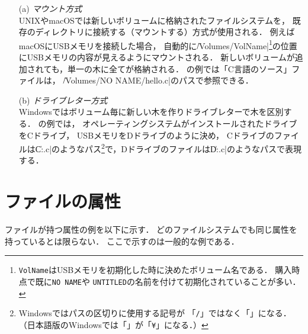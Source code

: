 \begin{itemize}
\item[(a)] \emph{マウント方式} \\
  UNIXやmacOSでは新しいボリュームに格納されたファイルシステムを，
  既存のディレクトリに接続する（マウントする）方式が使用される．
  例えばmacOSにUSBメモリを接続した場合，
  自動的に\|/Volumes/VolName|\footnote{
    \texttt{VolName}はUSBメモリを初期化した時に決めたボリューム名である．
    購入時点で既に\texttt{NO NAME}や
    \texttt{UNTITLED}の名前を付けて初期化されていることが多い．
  }の位置にUSBメモリの内容が見えるようにマウントされる．
  新しいボリュームが追加されても，単一の木に全てが格納される．
  の例では「C言語のソース」ファイルは，
  \|/Volumes/NO NAME/hello.c|のパスで参照できる．
\item[(b)] \emph{ドライブレター方式} \\
  Windowsではボリューム毎に新しい木を作りドライブレターで木を区別する．
  の例では，
  オペレーティングシステムがインストールされたドライブをCドライブ，
  USBメモリをDドライブのように決め，
  Cドライブのファイルは\|C:\Home\hello.c|のようなパス\footnote{
    Windowsではパスの区切りに使用する記号が
    「\texttt{/}」ではなく「\texttt{\bs}」になる．\\
    （日本語版のWindowsでは「\texttt{\bs}」が「\texttt{¥}」になる．）
  }で，Dドライブのファイルは\|D:\hello.c|のようなパスで表現する．
\end{itemize}

\section{ファイルの属性}
\label{fileAttribute}
ファイルが持つ属性の例を以下に示す．
どのファイルシステムでも同じ属性を持っているとは限らない．
ここで示すのは一般的な例である．

